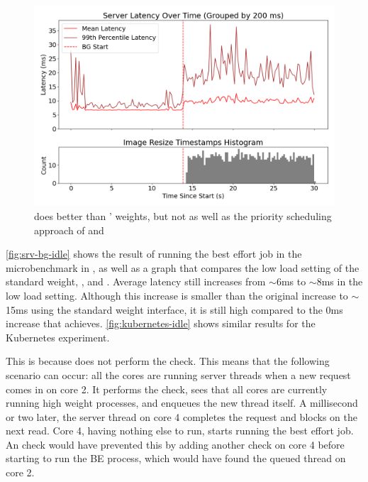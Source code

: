\begin{figure}[t]
    \centering
    \includegraphics[width=\columnwidth]{graphs/kubernetes-idle.png}
    \caption{ \schedidle{} does better than \cgroups{}' weights, but not as well
    as the priority scheduling approach of \rtclass{} and \schedbe{}
    }\label{fig:kubernetes-idle}
\end{figure}

\autoref{fig:srv-bg-idle} shows the result of running the best effort job in the
microbenchmark in \schedidle{}, as well as a graph that compares the low load
setting of the standard \cgroups{} weight, \schedbe{}, and \schedidle{}. Average
latency still increases from $\sim$6ms to $\sim$8ms in the low load setting.
Although this increase is smaller than the original increase to $\sim$15ms using
the standard weight interface, it is still high compared to the 0ms increase
that \schedbe{} achieves. \autoref{fig:kubernetes-idle} shows similar results
for the Kubernetes experiment.

This is because \schedidle{} does not perform the \exit{} check. This means that
the following scenario can occur: all the cores are running server threads when
a new request comes in on core 2. It performs the \entry{} check, sees that all
cores are currently running high weight processes, and enqueues the new thread
itself. A millisecond or two later, the server thread on core 4 completes the
request and blocks on the next read. Core 4, having nothing else to run, starts
running the best effort job. An \exit{} check would have prevented this by
adding another check on core 4 before starting to run the BE process, which
would have found the queued thread on core 2.